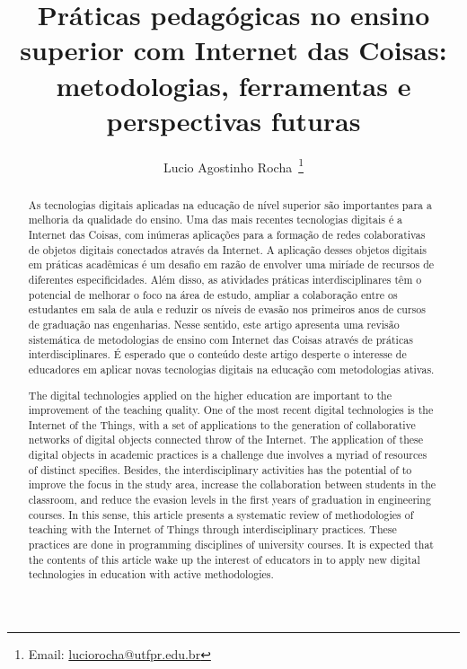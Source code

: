 \documentclass[portuguese]{textolivre}
\title{Práticas pedagógicas no ensino superior com Internet das Coisas: metodologias, ferramentas e perspectivas futuras}
\author[1]{Lucio Agostinho Rocha~\orcid{0000-0001-8804-8698}\thanks{Email: \href{mailto:luciorocha@utfpr.edu.br}{luciorocha@utfpr.edu.br}}}
\affil[1]{Universidade Tecnológica Federal do Paraná – campus Apucarana, Engenharia de Computação, Apucarana, PR, Brasil.}
\begin{document}
\maketitle

\begin{polyabstract}
\begin{abstract}
As tecnologias digitais aplicadas na educação de nível superior são importantes para a melhoria da qualidade do ensino. Uma das mais recentes tecnologias digitais é a Internet das Coisas, com inúmeras aplicações para a formação de redes colaborativas de objetos digitais conectados através da Internet. A aplicação desses objetos digitais em práticas acadêmicas é um desafio em razão de envolver uma miríade de recursos de diferentes especificidades. Além disso, as atividades práticas interdisciplinares têm o potencial de melhorar o foco na área de estudo, ampliar a colaboração entre os estudantes em sala de aula e reduzir os níveis de evasão nos primeiros anos de cursos de graduação nas engenharias. Nesse sentido, este artigo apresenta uma revisão sistemática de metodologias de ensino com Internet das Coisas através de práticas interdisciplinares. É esperado que o conteúdo deste artigo desperte o interesse de educadores em aplicar novas tecnologias digitais na educação com metodologias ativas.

\end{abstract}

\begin{english}
\begin{abstract}
The digital technologies applied on the higher education are important to the improvement of the teaching quality. One of the most recent digital technologies is the Internet of the Things, with a set of applications to the generation of collaborative networks of digital objects connected throw of the Internet. The application of these digital objects in academic practices is a challenge due involves a myriad of resources of distinct specifies. Besides, the interdisciplinary activities has the potential of to improve the focus in the study area,  increase the collaboration between students in the classroom, and reduce the evasion levels in the first years of graduation in engineering courses. In this sense, this article presents a systematic review of methodologies of teaching with the Internet of Things through interdisciplinary practices. These practices are done in programming disciplines of university courses. It is expected that the contents of this article wake up the interest of educators in to apply new digital technologies in education with active methodologies.

\end{abstract}
\end{english}
\end{polyabstract}
\end{document}
